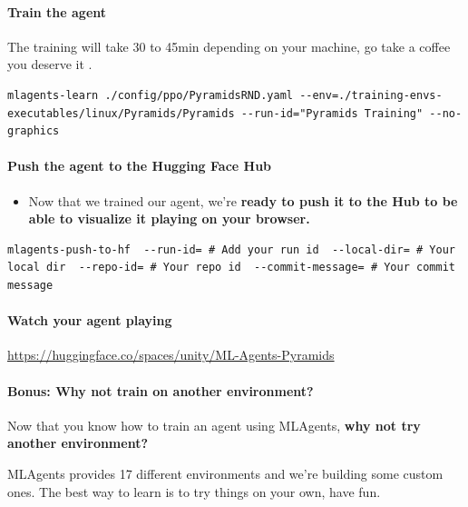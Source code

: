 \documentclass[11pt,a4paper]{article}
\begin{document}
\paragraph{Train the agent}\label{train-the-agent-1}

The training will take 30 to 45min depending on your machine, go take a coffee you deserve it .

\begin{lstlisting}
mlagents-learn ./config/ppo/PyramidsRND.yaml --env=./training-envs-executables/linux/Pyramids/Pyramids --run-id="Pyramids Training" --no-graphics
\end{lstlisting}

\paragraph{Push the agent to the Hugging Face Hub}\label{push-the-agent-to-the-hugging-face-hub-1}

\begin{itemize}
\tightlist
\item
  Now that we trained our agent, we're \textbf{ready to push it to the Hub to be able to visualize it playing on your browser.}
\end{itemize}

\begin{lstlisting}
mlagents-push-to-hf  --run-id= # Add your run id  --local-dir= # Your local dir  --repo-id= # Your repo id  --commit-message= # Your commit message
\end{lstlisting}

\paragraph{Watch your agent playing}\label{watch-your-agent-playing-1}

\url{https://huggingface.co/spaces/unity/ML-Agents-Pyramids}

\paragraph{Bonus: Why not train on another environment?}\label{bonus-why-not-train-on-another-environment}

Now that you know how to train an agent using MLAgents, \textbf{why not try another environment?}

MLAgents provides 17 different environments and we're building some custom ones. The best way to learn is to try things on your own, have fun.
\end{document}

